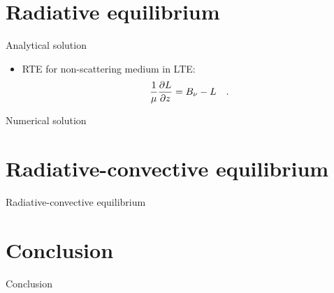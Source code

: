 \documentclass[aspectratio=43]{beamer}
\begin{document}
\section{Radiative equilibrium}
\begin{frame}{Analytical solution}
  \begin{itemize}
    \item RTE for non-scattering medium in LTE:
      \begin{equation}
        \label{eq:RTE_analytical}
        \frac{1}{\mu} \pdv{L}{z} = B_\nu - L
        \quad .
      \end{equation}
  \end{itemize}
\end{frame}

\begin{frame}{Numerical solution}
\end{frame}



\section{Radiative-convective equilibrium}
\begin{frame}{Radiative-convective equilibrium}
\end{frame}



\section{Conclusion}
\begin{frame}{Conclusion}
\end{frame}
\end{document}
